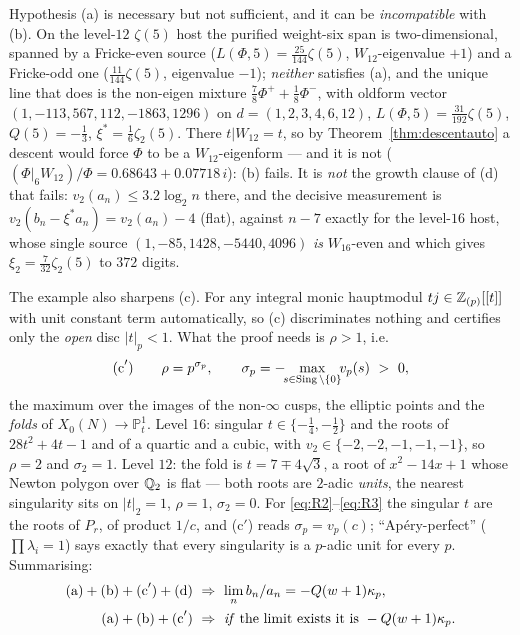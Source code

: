 \begin{remark}
\label{rem:zeta5caution}
Hypothesis \textup{(a)} is necessary but not sufficient, and it can be
\emph{incompatible} with \textup{(b)}.  On the level-$12$ $\zeta(5)$ host the
purified weight-six span is two-dimensional, spanned by a Fricke-even source
($L(\Phi,5)=\tfrac{25}{144}\zeta(5)$, $W_{12}$-eigenvalue $+1$) and a
Fricke-odd one ($\tfrac{11}{144}\zeta(5)$, eigenvalue $-1$); \emph{neither}
satisfies \textup{(a)}, and the unique line that does is the non-eigen mixture
$\tfrac78\Phi^++\tfrac18\Phi^-$, with oldform vector
$(1,-113,567,112,-1863,1296)$ on $d=(1,2,3,4,6,12)$,
$L(\Phi,5)=\tfrac{31}{192}\zeta(5)$, $Q(5)=-\tfrac13$,
$\xi^*=\tfrac16\zeta_2(5)$.  There $t|W_{12}=t$, so by
Theorem~\ref{thm:descentauto} a descent would force $\Phi$ to be a
$W_{12}$-eigenform --- and it is not
($(\Phi|_6W_{12})/\Phi=0.68643+0.07718\,i$): \textup{(b)} fails.  It is
\emph{not} the growth clause of \textup{(d)} that fails: $v_2(a_n)\le3.2\log_2n$
there, and the decisive measurement is
$v_2(b_n-\xi^*a_n)=v_2(a_n)-4$ (flat), against $n-7$ exactly for the level-$16$
host, whose single source $(1,-85,1428,-5440,4096)$ \emph{is} $W_{16}$-even and
which gives $\xi_2=\tfrac7{32}\zeta_2(5)$ to $372$ digits.

The example also sharpens \textup{(c)}.  For any integral monic hauptmodul
$tj\in\mathbb{Z}_{(p)}[[t]]$ with unit constant term automatically, so \textup{(c)}
discriminates nothing and certifies only the \emph{open} disc $|t|_p<1$.  What
the proof needs is $\rho>1$, i.e.
\[
\textup{(c}'\textup{)}\qquad
\rho=p^{\sigma_p},\qquad
\sigma_p=-\!\!\max_{s\in\operatorname{Sing}\setminus\{0\}}\!\!v_p(s)\ >\ 0,
\]
the maximum over the images of the non-$\infty$ cusps, the elliptic points and
the \emph{folds} of $X_0(N)\to\mathbb P^1_t$.  Level $16$: singular
$t\in\{-\tfrac14,-\tfrac12\}$ and the roots of $28t^2+4t-1$ and of a quartic
and a cubic, with $v_2\in\{-2,-2,-1,-1,-1\}$, so $\rho=2$ and $\sigma_2=1$.
Level $12$: the fold is $t=7\mp4\sqrt3$, a root of $x^2-14x+1$ whose Newton
polygon over $\mathbb{Q}_2$ is flat --- both roots are $2$-adic \emph{units}, the
nearest singularity sits on $|t|_2=1$, $\rho=1$, $\sigma_2=0$.  For
\eqref{eq:R2}--\eqref{eq:R3} the singular $t$ are the roots of $P_r$, of product
$1/c$, and \textup{(c}$'$\textup{)} reads $\sigma_p=v_p(c)$; ``Ap\'ery-perfect''
($\prod\lambda_i=1$) says exactly that every singularity is a $p$-adic unit for
every $p$.  Summarising:
\[
\begin{aligned}
\textup{(a)}+\textup{(b)}+\textup{(c}'\textup{)}+\textup{(d)}\ &\Rightarrow\
\lim_n b_n/a_n=-Q(w+1)\kappa_p,\\
\textup{(a)}+\textup{(b)}+\textup{(c}'\textup{)}\ &\Rightarrow\
\text{\emph{if} the limit exists it is }-Q(w+1)\kappa_p .
\end{aligned}
\]
\end{remark}

